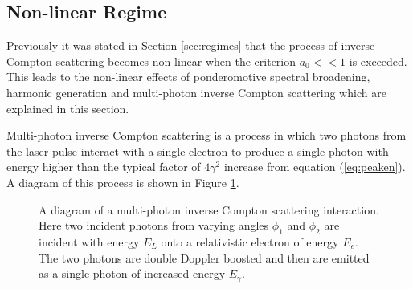 \documentclass[11pt]{article}
\begin{document}
\subsection{Non-linear Regime}
\label{sec:nonlin} 

Previously it was stated in Section \ref{sec:regimes} that the process of inverse Compton scattering becomes non-linear when the criterion $a_{0} << 1$ is exceeded. This leads to the non-linear effects of ponderomotive spectral broadening, harmonic generation and multi-photon inverse Compton scattering which are explained in this section.

Multi-photon inverse Compton scattering is a process in which two photons from the laser pulse interact with a single electron to produce a single photon with energy higher than the typical factor of $4\gamma^{2}$ increase from equation (\ref{eq:peaken}). A diagram of this process is shown in Figure \ref{fig:multiphoton}.

\begin{figure}[H]
\centering
{}
\caption{\label{fig:multiphoton} A diagram of a multi-photon inverse Compton scattering interaction. Here two incident photons from varying angles $\phi_{1}$ and $\phi_{2}$ are incident with energy $E_{L}$ onto a relativistic electron of energy $E_{e}$. The two photons are double Doppler boosted and then are emitted as a single photon of increased energy $E_{\gamma}$.}
\end{figure}
\end{document}
